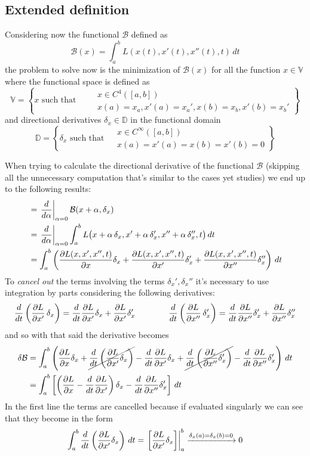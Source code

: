 \subsection*{Extended definition}
Considering now the functional $\mathcal B$ defined as
\begin{equation} \label{eq:func:lag2}
	\mathcal B(x) = \int_a^b L (x(t),x'(t),x''(t),t)\, dt
\end{equation}
the problem to solve now is the minimization of $\mathcal B(x)$ for all the function $x\in \mathds V$ where the functional space is defined as
\[ \mathds V = \left\{ x \textrm{ such that } \quad \begin{aligned}
	& x\in C^4([a,b]) \\ & x(a) = x_a, x'(a) = x_a', x(b) = x_b, x'(b) = x_b'
\end{aligned} \right\} \]
and directional derivatives $\delta_x \in \mathds D$ in the functional domain
\[ \mathds D = \left\{ \delta_x \textrm{ such that } \begin{aligned}
	& x\in C^\infty([a,b]) \\ & x(a) = x'(a) = x(b) = x'(b) = 0
\end{aligned} \right\} \]

When trying to calculate the directional derivative of the functional $\mathcal B$ (skipping all the unnecessary computation that's similar to the cases yet studies) we end up to the following results:
\begin{align*}
	& = \left.\frac{d}{d\alpha}\right|_{\alpha = 0} \mathcal B(x+\alpha, \delta_x) \\
	& = \left. \frac{d}{d\alpha}\right|_{\alpha = 0} \int_a^b L \big( x + \alpha\, \delta_x, x' + \alpha\, \delta_x', x''+\alpha\, \delta_x'',t\big) \, dt \\
	& = \int_a^b \left( \frac{\partial L (x,x',x'',t)}{\partial x}\delta_x + \frac{\partial L (x,x',x'',t)}{\partial x'}\delta_x' + \frac{\partial L (x,x',x'',t)}{\partial x''}\delta_x'' \right) \, dt
\end{align*}
To \textit{cancel out} the terms involving the terms $\delta_x',\delta_x''$ it's necessary to use integration by parts considering the following derivatives:
\[ \frac d{dt} \left(\frac{\partial L }{\partial x'}\, \delta_x \right) = \frac d{dt} \frac{\partial L }{\partial x'} \delta_x + \frac{\partial L }{\partial x'} \delta_x' \qquad \qquad \frac d{dt} \left(\frac{\partial L }{\partial x''}\, \delta_x' \right) = \frac d{dt} \frac{\partial L }{\partial x''} \delta_x' + \frac{\partial L }{\partial x''}\delta_x''  \]
and so with that said the derivative becomes
\begin{align*}
	\delta \mathcal B& = \int_a^b \left( \frac{\partial L }{\partial x}\delta_x + \cancel{\frac d{dt} \left(\frac{\partial L }{\partial x'} \delta_x \right)} -  \frac{d}{dt} \frac{\partial L }{\partial x'} \delta_x + \cancel{\frac d{dt}\left( \frac{\partial L }{\partial x''} \delta_x' \right) } - \frac{d}{dt} \frac{\partial L }{\partial x''} \delta_x' \right)\, dt \\
	& = \int_a^b \left[\left( \frac{\partial L }{\partial x}  -  \frac{d}{dt} \frac{\partial L }{\partial x'} \right)\delta_x - \frac{d}{dt} \frac{\partial L }{\partial x''} \delta_x' \right]\, dt
\end{align*}
In the first line the terms are cancelled because if evaluated singularly we can see that they become in the form
\[ \int_a^b \frac d{dt} \left(\frac{\partial L }{\partial x'} \delta_x\right) \, dt = \left. \left[ \frac{\partial L }{\partial x'} \delta_x \right]\right|_a^b \xrightarrow{\delta_x(a) = \delta_x(b) = 0} 0  \]

